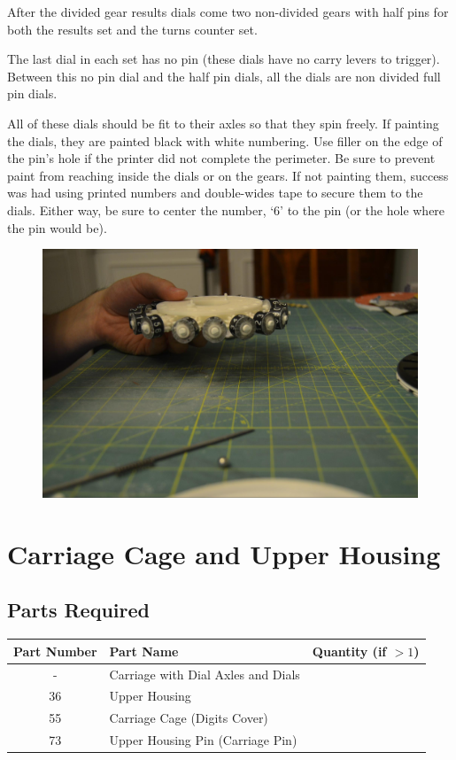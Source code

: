 \documentclass[openany]{book}
\begin{document}
After the divided gear results dials come two non-divided gears with half pins for both the results set and the turns counter set.

The last dial in each set has no pin (these dials have no carry levers to trigger). Between this no pin dial and the half pin dials, all the dials are non divided full pin dials.

All of these dials should be fit to their axles so that they spin freely. If painting the dials, they are painted black with white numbering. Use filler on the edge of the pin's hole if the printer did not complete the perimeter. Be sure to prevent paint from reaching inside the dials or on the gears. If not painting them, success was had using printed numbers and double-wides tape to secure them to the dials. Either way, be sure to center the number, ‘6’ to the pin (or the hole where the pin would be).

\begin{figure}[!ht]
	\centering
	\includegraphics[width=.75\textwidth]{images/image19.jpg}
	\caption{}
	\label{fig:image19}	
\end{figure}



\chapter{Carriage Cage and Upper Housing}
\section{Parts Required}
\begin{table}[!ht]
	\centering
	\begin{tabular}{clc}
		Part Number & Part Name & Quantity (if $>1$) \\ \hline
		- & Carriage with Dial Axles and Dials & \\
		36 & Upper Housing & \\
		55 & Carriage Cage (Digits Cover) & \\
		73 & Upper Housing Pin (Carriage Pin) & 
	\end{tabular}
\end{table}
\end{document}
